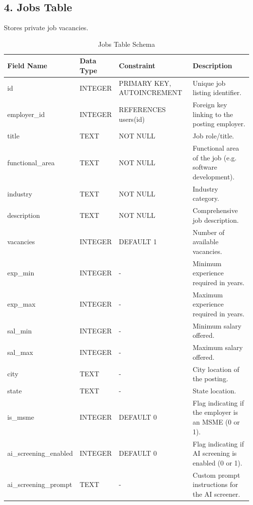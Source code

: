 \documentclass[12pt,a4paper]{report}
\begin{document}
\subsection{4. Jobs Table}
Stores private job vacancies.
\begin{table}[H]
\centering
\small
\begin{tabular}{|p{2.8cm}|p{2.0cm}|p{2.5cm}|p{6.7cm}|}
\hline
\textbf{Field Name} & \textbf{Data Type} & \textbf{Constraint} & \textbf{Description} \\ \hline
id & INTEGER & PRIMARY KEY, AUTOINCREMENT & Unique job listing identifier. \\ \hline
employer\_id & INTEGER & REFERENCES users(id) & Foreign key linking to the posting employer. \\ \hline
title & TEXT & NOT NULL & Job role/title. \\ \hline
functional\_area & TEXT & NOT NULL & Functional area of the job (e.g. software development). \\ \hline
industry & TEXT & NOT NULL & Industry category. \\ \hline
description & TEXT & NOT NULL & Comprehensive job description. \\ \hline
vacancies & INTEGER & DEFAULT 1 & Number of available vacancies. \\ \hline
exp\_min & INTEGER & - & Minimum experience required in years. \\ \hline
exp\_max & INTEGER & - & Maximum experience required in years. \\ \hline
sal\_min & INTEGER & - & Minimum salary offered. \\ \hline
sal\_max & INTEGER & - & Maximum salary offered. \\ \hline
city & TEXT & - & City location of the posting. \\ \hline
state & TEXT & - & State location. \\ \hline
is\_msme & INTEGER & DEFAULT 0 & Flag indicating if the employer is an MSME (0 or 1). \\ \hline
ai\_screening\_enabled & INTEGER & DEFAULT 0 & Flag indicating if AI screening is enabled (0 or 1). \\ \hline
ai\_screening\_prompt & TEXT & - & Custom prompt instructions for the AI screener. \\ \hline
\end{tabular}
\caption{Jobs Table Schema}
\end{table}
\end{document}
